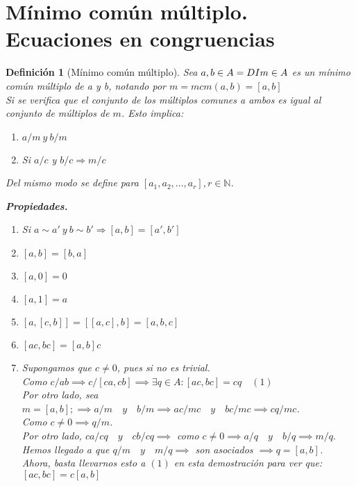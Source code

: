 \documentclass[11pt, a4paper, titlepage]{article}
\makeatletter
\renewenvironment{proof}[1][\proofname] {\vspace{-15pt}\par\pushQED{\qed}\normalfont\topsep6\p@\@plus6\p@\relax\trivlist\item[\hskip\labelsep\it#1\@addpunct{.}]\ignorespaces}{\popQED\endtrivlist\@endpefalse}
\theoremstyle{theorem-style}
\theoremstyle{definition-style}
\newtheorem*{ndef}{Definición}
\theoremstyle{remark-style}
\theoremstyle{example-style}
\newenvironment{nlist}
{\begin{enumerate}
\renewcommand\labelenumi{(\emph{\roman{enumi})}}}
{\end{enumerate}}
\makeatother
\begin{document}
\section{Mínimo común múltiplo. Ecuaciones en congruencias}
\begin{ndef}[Mínimo común múltiplo]
	Sea $a, b \in A =DI \\ m \in A $ es un mínimo común múltiplo de a y b, notando por $m = mcm(a,b) = [a,b]$  \\
Si se verifica que el conjunto de los múltiplos comunes a ambos es igual al conjunto de múltiplos de $m$. Esto implica: 
\begin{enumerate}
\item $a/m \ y \ b/m$
\item Si $a/c$ y $b/c \Rightarrow m/c$ \\
\end{enumerate}

Del mismo modo se define para $[a_1, a_2, ..., a_r],r \in \mathbb{N}$.

\textbf{Propiedades. }
\begin{nlist}
\item Si $a\sim a' \ y \ b\sim b' \Rightarrow [a,b]=[a',b']$
\item $[a,b] = [b,a]$
\item $[a,0] = 0$
\item $[a,1] = a$
\item $[a,[c,b]]= [[a,c],b] = [a,b,c]$
\item $[ac,bc] =[a,b]c$\\

\begin{proof}[Demostración del último.]
	
	Supongamos que $c\ne 0$, pues si no es trivial.\\
	Como $c/ab\implies c/[ca,cb] \implies \exists q \in A : [ac,bc] = cq\quad (1)$\\
	Por otro lado, sea $m = [a,b]; \implies a/m \quad y \quad b/m \implies ac/mc \quad y \quad bc/mc \implies cq/mc$.\\
	Como $c\ne 0 \implies q/m$.\\
	Por otro lado, $ca/cq \quad y \quad cb/cq \implies$ como $c\ne 0 \implies a/q \quad y \quad b/q \implies m/q.$\\
	Hemos llegado a que $q/m \quad y \quad m/q \implies $ son asociados $\implies q=[a,b]$.\\
	Ahora, basta llevarnos esto a $(1)$ en esta demostración para ver que:\\ $[ac,bc] = c[a,b]$
\end{proof}
\end{nlist}
\end{ndef}
\end{document}
